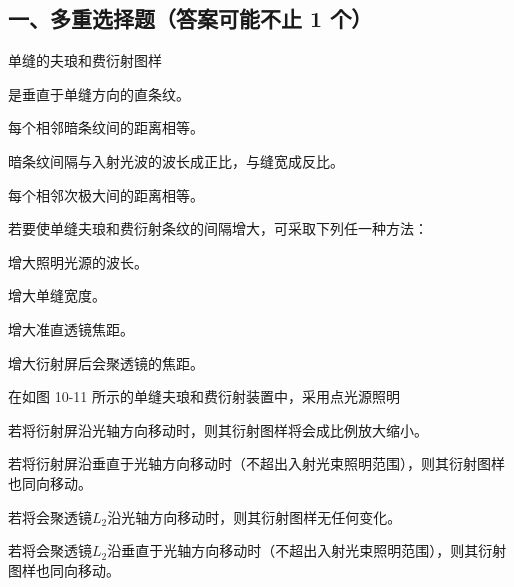\documentclass[standard, analysis, notocnum]{ExBook}
\newcommand{\answerarea}[1][8cm]{%
  \par\vspace{2mm}%
  \noindent{\color{themeColor!35}\rule{\linewidth}{0.4pt}}\par
  \noindent\begin{minipage}[t][#1][t]{\linewidth}\vspace{0pt}\end{minipage}\par
  \noindent{\color{themeColor!35}\rule{\linewidth}{0.4pt}}\par
}
\begin{document}
\subsection{一、多重选择题（答案可能不止 1 个）}
\begin{qitems}
\begin{bbox}
\qitem 单缝的夫琅和费衍射图样
\par\noindent\hspace{2em}是垂直于单缝方向的直条纹。
\par\noindent\hspace{2em}每个相邻暗条纹间的距离相等。
\par\noindent\hspace{2em}暗条纹间隔与入射光波的波长成正比，与缝宽成反比。
\par\noindent\hspace{2em}每个相邻次极大间的距离相等。
\answerarea[3.5cm]
\end{bbox}
\begin{bbox}
\qitem 若要使单缝夫琅和费衍射条纹的间隔增大，可采取下列任一种方法：
\par\noindent\hspace{2em}增大照明光源的波长。
\par\noindent\hspace{2em}增大单缝宽度。
\par\noindent\hspace{2em}增大准直透镜焦距。
\par\noindent\hspace{2em}增大衍射屏后会聚透镜的焦距。
\answerarea[3.5cm]
\end{bbox}
\begin{bbox}
\qitem 在如图 10-11 所示的单缝夫琅和费衍射装置中，采用点光源照明
\par\noindent\hspace{2em}若将衍射屏沿光轴方向移动时，则其衍射图样将会成比例放大缩小。
\par\noindent\hspace{2em}若将衍射屏沿垂直于光轴方向移动时（不超出入射光束照明范围），则其衍射图样也同向移动。
\par\noindent\hspace{2em}若将会聚透镜$L_{2}$沿光轴方向移动时，则其衍射图样无任何变化。
\par\noindent\hspace{2em}若将会聚透镜$L_{2}$沿垂直于光轴方向移动时（不超出入射光束照明范围），则其衍射图样也同向移动。

\end{bbox}
\end{qitems}
\end{document}

